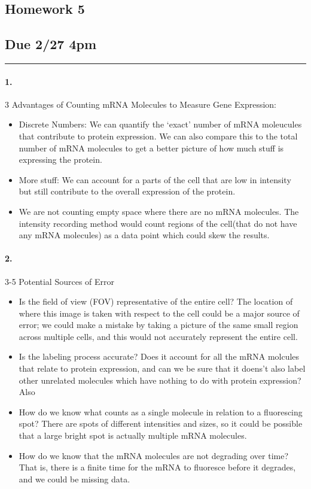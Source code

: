 \documentclass[../main.tex]{subfiles}
\begin{document}
\setcounter{section}{5}
\begin{center}
    \section*{Homework 5}
    \subsection*{Due 2/27 4pm}
\end{center}
\hrule \vspace{10px}

\paragraph*{1.} 3 Advantages of Counting mRNA Molecules to Measure Gene Expression:
\begin{itemize}
    \item Discrete Numbers: We can quantify the `exact' number of mRNA moleucules that contribute to
    protein expression. We can also compare this to the total number of mRNA molecules to get a better
    picture of how much stuff is expressing the protein.
    \item More stuff: We can account for a parts of the cell that are low in intensity but still contribute to
    the overall expression of the protein. 
    \item We are not counting empty space where there are no mRNA molecules. The intensity
    recording method would count regions of the cell(that do not have any mRNA molecules) as a data
    point which could skew the results.
\end{itemize}
\paragraph*{2.} 3-5 Potential Sources of Error
\begin{itemize}
    \item Is the field of view (FOV) representative of the entire cell? The location of where this
    image is taken with respect to the cell could be a major source of error; we could make a
    mistake by taking a picture of the same small region across multiple cells, and this would not
    accurately represent the entire cell.
    \item Is the labeling process accurate? Does it account for all the mRNA molcules that relate to
    protein expression, and can we be sure that it doens't also label other unrelated molecules 
    which have nothing to do with protein expression? Also 
    \item How do we know what counts as a single molecule in relation to a fluorescing spot? There
    are spots of different intensities and sizes, so it could be possible that a large bright spot
    is actually multiple mRNA molecules.
    \item How do we know that the mRNA molecules are not degrading over time? That is, there is a
    finite time for the mRNA to fluoresce before it degrades, and we could be missing data.
\end{itemize}
\end{document}
